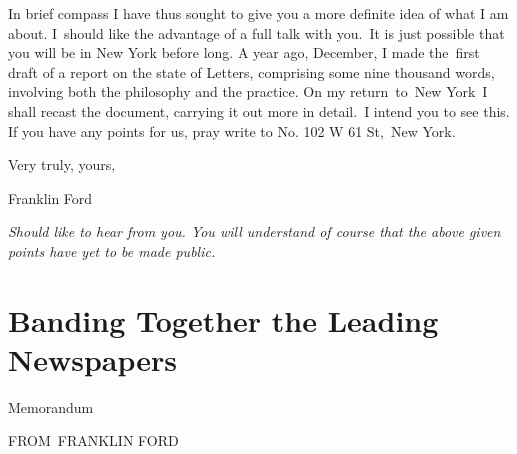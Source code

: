 \documentclass[openany,nobib]{tufte-book}
\let\oldchapter\chapter
\def\chapter{%
  \setcounter{footnote}{0}%
  \oldchapter
}
\begin{document}
In brief compass I have thus sought to give you a more definite idea of
what I am about. I~should like the advantage of a full talk with you.~It
is just possible that you will be in New York before long. A year ago,
December, I made the~first draft of a report on the state of Letters,
comprising some nine thousand words, involving both the philosophy and
the practice. On my return~to~New York~I shall recast the document,
carrying it out more in detail.~I intend you to see this. If you have
any points for us, pray write to No. 102 W 61 St,~New York.~

\vspace{.15in}

\hfill Very truly, yours,~

\vspace{0.1in}

\hfill Franklin Ford

\vspace{.15in}

\noindent\emph{Should like to hear from you. You will understand of course that the
above given points have yet to be made public.}


\chapter[Banding Together the Leading Newspapers]{Banding Together the Leading Newspapers}
\label{ch:Banding Together the Leading Newspapers}

\vspace{.2in}

\begin{LARGE}
    



\end{LARGE}

\vspace{0.5in}


\begin{center}
    


Memorandum

\vspace{.1in}

\Large{FROM~FRANKLIN FORD}

\end{center}
\end{document}
